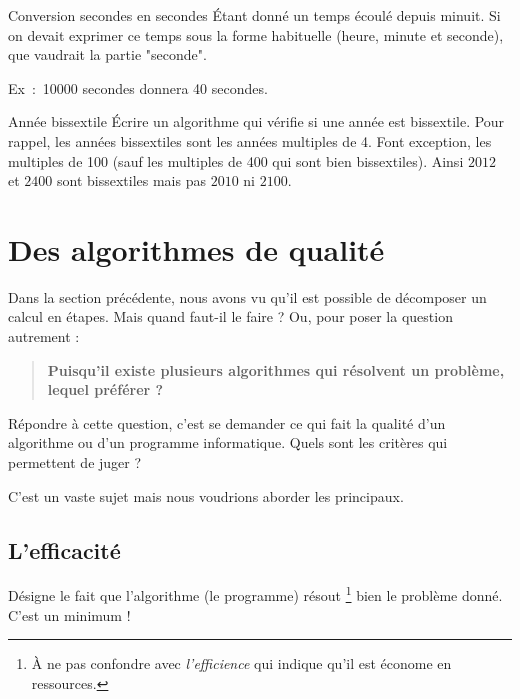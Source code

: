 			\begin{Exercice}{Conversion secondes en secondes}
				Étant donné un temps écoulé depuis minuit.
				Si on devait exprimer ce temps sous la forme
				habituelle (heure, minute et seconde),
				que vaudrait la partie "seconde".
		
				Ex~:~10000 secondes donnera 40 secondes.
			\end{Exercice}	
		
			\begin{Exercice}{Année bissextile}
				Écrire un algorithme qui vérifie si une année est bissextile. 
				Pour rappel, les années bissextiles sont les années multiples de 4. 
				Font exception, les multiples de 100 
				(sauf les multiples de 400 qui sont bien bissextiles). 
				Ainsi $2012$ et $2400$ sont bissextiles mais pas $2010$ ni $2100$.
			\end{Exercice}
			 		 
	\section{Des algorithmes de qualité}
	
		Dans la section précédente,
		nous avons vu qu'il est possible de décomposer un calcul en étapes.
		Mais quand faut-il le faire ?	
		Ou, pour poser la question autrement :
		
			\begin{quote}
				\textbf{Puisqu'il existe plusieurs algorithmes 
				qui résolvent un problème, lequel préférer ?}
			\end{quote}
		
		Répondre à cette question, 
		c'est se demander ce qui fait la qualité d'un algorithme
		ou d'un programme informatique.
		Quels sont les critères qui permettent de juger ?
		
		C'est un vaste sujet mais nous voudrions aborder les principaux.
		
		\subsection{L'efficacité}
			
			Désigne le fait que l'algorithme (le programme)
			résout%
			\footnote{%
				À ne pas confondre avec \emph{l'efficience}
				qui indique qu'il est économe en ressources.
			}
			bien le problème donné.
			C'est un minimum !
		
